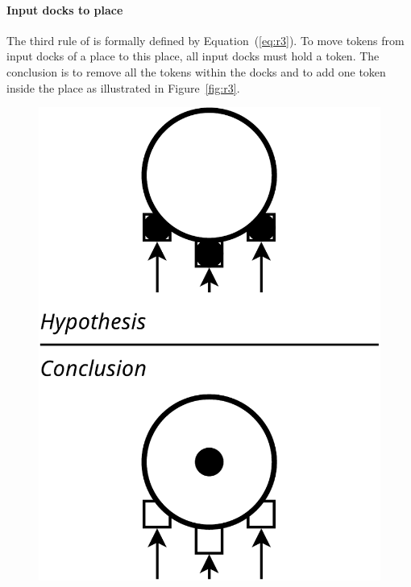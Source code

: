 \paragraph{Input docks to place}{

The third rule of \mad is formally defined by
Equation~(\ref{eq:r3}). To move tokens from input docks of a place to
this place, all input docks must hold a token. The conclusion is to remove
all the tokens within the docks and to add one token inside the
place as illustrated in Figure~\ref{fig:r3}.

\begin{figure}[t]

\begin{minipage}[h]{0.45\columnwidth}%
  \centering
  \includegraphics[width=0.65\columnwidth]{./images/inputdocks_to_place.pdf}
\end{minipage}
\hfill
\begin{minipage}[h]{0.45\columnwidth}%
  \centering

\end{minipage}
\end{figure}}
